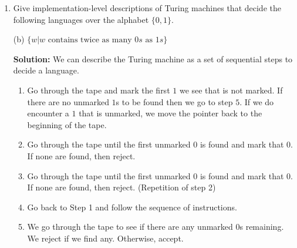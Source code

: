 \documentclass[11pt]{article}
\begin{document}
\begin{enumerate}
\begin{proof}
\begin{enumerate}
\begin{enumerate}
\item In this case, $y$ is contained in $1^j$ in such a way that $j \geq 2P$.  In this case, if $|y| = 1$ then we can set $i = 2$ and if $|y| > 1$ we can set $i=1$, which will result in a contradiction.  

\item In the third subcase, if $|v| = 0$ or $|y| = 0$ then we set $i = 1$ (or really any positive integer) which will result in a contradiction because there will exist an interval in $s$ between one of the $\#$ symbols that doesn't have the correct number of $1$s. 
\end{enumerate}
\end{enumerate}
Therefore, because we reach a contradiction in all possible cases, we have proven that $Y$ is not a context free language.  
\end{proof}

\newpage

\item
Give implementation-level descriptions of Turing machines that decide the following
languages over the alphabet $\{0,1\}$.

(b) $\{w | w \text{ contains twice as many }0s \text{ as } 1s\}$

\textbf{Solution: } We can describe the Turing machine as a set of sequential steps to decide a language.  
\begin{enumerate} [(1)]
\item Go through the tape and mark the first $1$ we see that is not marked.  If there are no unmarked $1$s to be found then we go to step $5$.  If we do encounter a $1$ that is unmarked, we move the pointer back to the beginning of the tape.  

\item Go through the tape until the first unmarked $0$ is found and mark that $0$.  If none are found, then reject.  

\item Go through the tape until the first unmarked $0$ is found and mark that $0$.  If none are found, then reject.  (Repetition of step 2)

\item Go back to Step 1 and follow the sequence of instructions.  

\item We go through the tape to see if there are any unmarked $0$s remaining.  We reject if we find any.  Otherwise, accept.  

\end{enumerate}


\end{enumerate}
\end{document}
